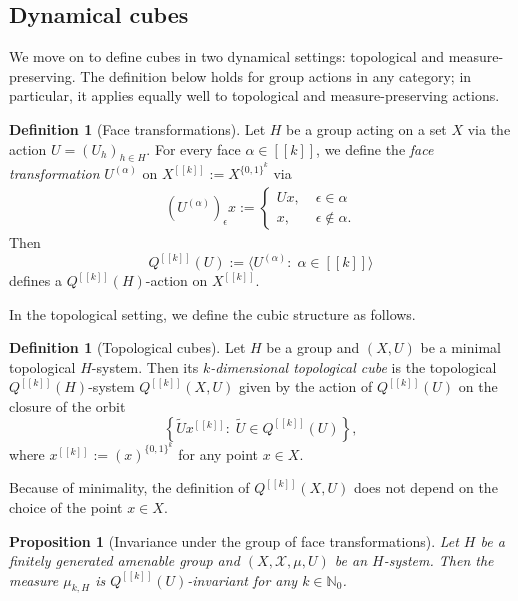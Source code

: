 \documentclass[11pt]{amsart}
\newtheorem{proposition}[lemma]{Proposition}
\theoremstyle{definition}
\newtheorem{definition}[lemma]{Definition}
\newcommand{\N}{{\mathbb N}}
\newcommand{\CX}{{\mathcal X}}
\newcommand{\eps}{\epsilon}
\newcommand{\cube}[1]{{[\![#1]\!]}}
\newcommand{\1}{{\mathbf{1}}}
\newcommand{\rem}[1]{\left \{ #1 \right \}}
\begin{document}
\subsection{Dynamical cubes} We move on to define cubes in two dynamical settings: topological and measure-preserving.
The definition below holds for group actions in any category; in particular, it applies equally well to topological and measure-preserving actions.
 \begin{definition}[Face transformations]
     Let $H$ be a group acting on a set $X$ via the action $U=(U_h)_{h\in H}$. For every face $\alpha\in\cube{k}$, we define the \textit{face transformation} $U^{(\alpha)}$ on $X^\cube{k}:=X^{\{0,1\}^k}$ via
    \begin{align*}
        (U^{(\alpha)})_\eps x := \begin{cases} Ux,\; &\eps\in\alpha\\
        x,\; &\eps\notin\alpha.
        \end{cases}
    \end{align*}
    Then 
    $$Q^\cube{k}(U):=\langle U^{(\alpha)}\colon\; \alpha\in\cube{k}\rangle$$
    defines a $Q^\cube{k}(H)$-action on $X^\cube{k}$.
 \end{definition}

In the topological setting, we define the cubic structure as follows. 
\begin{definition}[Topological cubes]
    Let $H$ be a group and $(X, U)$ be a minimal topological $H$-system. 
    Then its \textit{$k$-dimensional topological cube} is the topological $Q^\cube{k}(H)$-system $Q^\cube{k}(X, U)$ given by the action of $Q^\cube{k}(U)$ on the closure of the orbit $$\rem{\widetilde Ux^\cube{k}\colon\; \widetilde U\in Q^\cube{k}(U)},$$ where $x^\cube{k}:=(x)^{\{0,1\}^k}$ for any point $x\in X$.
\end{definition}
Because of minimality, the definition of $Q^\cube{k}(X, U)$ does not depend on the choice of the point $x\in X$.

\begin{proposition}[Invariance under the group of face transformations]\label{P: face transformations invariance}
    Let $H$ be a  finitely generated amenable group and $(X, \CX, \mu, U)$ be an $H$-system. Then the measure $\mu_{k,H}$ is $Q^\cube{k}(U)$-invariant for any $k\in\N_0$.
\end{proposition}
\end{document}
